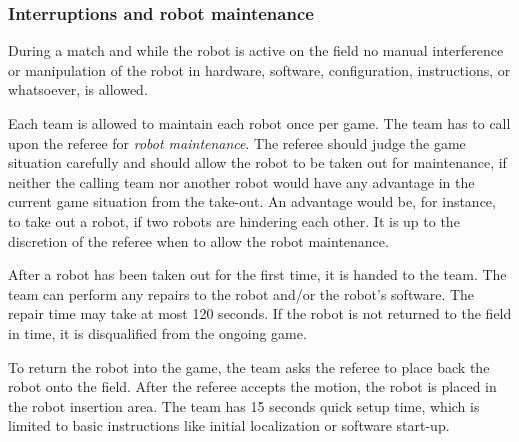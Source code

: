 \documentclass[12pt,twoside]{article}
\begin{document}

\subsubsection{Interruptions and robot maintenance}
\label{sec:robot-maintenance}
During a match and while the robot is active on the field no manual
interference or manipulation of the robot in hardware, software,
configuration, instructions, or whatsoever, is allowed.


Each team is allowed to maintain each robot once per game. The team
has to call upon the referee for \textit{robot maintenance}. The
referee should judge the game situation carefully and should allow the
robot to be taken out for maintenance, if neither the calling team
nor another robot would have any advantage in the current game
situation from the take-out. An advantage would be, for instance, to
take out a robot, if two robots are hindering each other. It is up to
the discretion of the referee when to allow the robot maintenance.


After a robot has been taken out for the first time, it is handed to
the team. The team can perform any repairs to the robot and/or the
robot's software. %
The repair time may take at most 120 seconds. If the robot is not
returned to the field in time, it is disqualified from the ongoing
game.

To return the robot into the game, the team asks the referee to place
back the robot onto the field. After the referee accepts the motion,
the robot is placed in the robot insertion area. The team has 15
seconds quick setup time, which is limited to basic instructions like
initial localization or software start-up.
\end{document}
